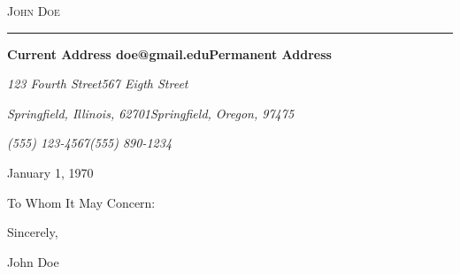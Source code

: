 \documentclass[10pt,oneside]{article}
\makeatletter
\newcommand{\name}{John Doe}
\newcommand{\focoaddrtop}{123 Fourth Street}
\newcommand{\focoaddrbot}{Springfield, Illinois, 62701}
\newcommand{\homeaddrtop}{567 Eigth Street}
\newcommand{\homeaddrbot}{Springfield, Oregon, 97475}
\newcommand{\cellphone}{(555) 123-4567}
\newcommand{\homephone}{(555) 890-1234}
\newcommand{\email}{doe@gmail.edu}
\newcommand{\bigname}[1]{
	\begin{center}\huge\scshape#1\end{center}
}
\makeatother
\begin{document}
 \selectfont

\bigname{\name}
\vspace{-8pt} \rule{\textwidth}{1pt}

\vspace{-1pt} {\small\bfseries Current Address \hfill \mdseries\email \hfill \bfseries Permanent Address}

\vspace{-1pt} {\small\itshape \focoaddrtop \hfill \homeaddrtop}

\vspace{-1pt} {\small\itshape \focoaddrbot \hfill \homeaddrbot}

\vspace{-1pt} {\small\itshape \cellphone \hfill \homephone}



\vspace{8 pt}
\vspace{\baselineskip}
\vspace{\baselineskip}
\vspace{\baselineskip}
\vspace{\baselineskip}

\large January 1, 1970

\vspace{\baselineskip}
\vspace{\baselineskip}

\large To Whom It May Concern:

\vspace{\baselineskip}
\vspace{\baselineskip}


\vspace{\baselineskip}

 
\vspace{\baselineskip}
\vspace{\baselineskip}

Sincerely,

\vspace{\baselineskip}

John Doe
\end{document}
